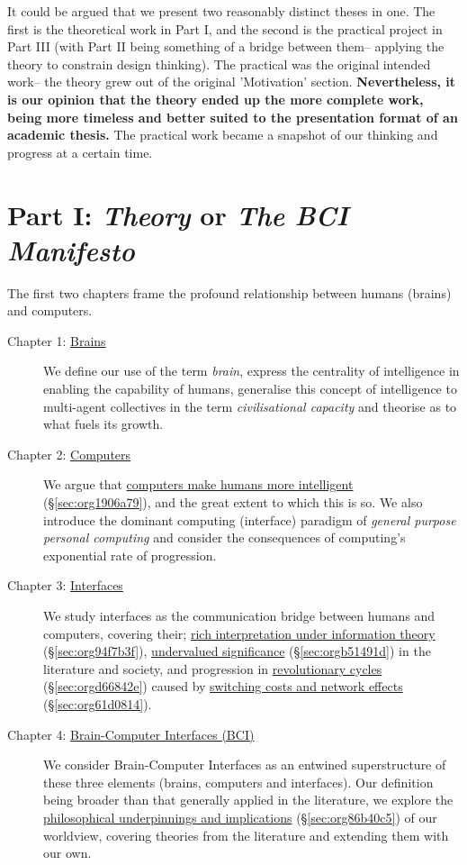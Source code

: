 \documentclass[logo,bsc,singlespacing,parskip]{infthesis}
\begin{document}
It could be argued that we present two reasonably distinct theses in one.
The first is the theoretical work in Part I, and the second is the practical project in Part III (with Part II being something of a bridge between them-- applying the theory to constrain design thinking).
The practical was the original intended work-- the theory grew out of the original 'Motivation' section.
\textbf{Nevertheless, it is our opinion that the theory ended up the more complete work, being more timeless and better suited to the presentation format of an academic thesis.}
The practical work became a snapshot of our thinking and progress at a certain time.
\section*{Part I: \emph{Theory} or \emph{The BCI Manifesto}}
\label{sec:org2b6b7c0}
The first two chapters frame the profound relationship between humans (brains) and computers.

\begin{description}
\item[{Chapter 1: \hyperref[sec:org3af2793]{Brains}}] We define our use of the term \emph{brain}, express the centrality of intelligence in enabling the capability of humans, generalise this concept of intelligence to multi-agent collectives in the term \emph{civilisational capacity} and theorise as to what fuels its growth.

\item[{Chapter 2: \hyperref[sec:org21e9465]{Computers}}] We argue that \hyperref[sec:org1906a79]{computers make humans more intelligent} (\S \ref{sec:org1906a79}), and the great extent to which this is so.
We also introduce the dominant computing (interface) paradigm of \emph{general purpose personal computing} and consider the consequences of computing's exponential rate of progression.

\item[{Chapter 3: \hyperref[sec:org020dbaa]{Interfaces}}] We study interfaces as the communication bridge between humans and computers, covering their;  \hyperref[sec:org94f7b3f]{rich interpretation under information theory} (\S \ref{sec:org94f7b3f}), \hyperref[sec:orgb51491d]{undervalued significance} (\S \ref{sec:orgb51491d}) in the literature and society, and progression in \hyperref[sec:orgd66842e]{revolutionary cycles} (\S \ref{sec:orgd66842e}) caused by \hyperref[sec:org61d0814]{switching costs and network effects} (\S \ref{sec:org61d0814}).

\item[{Chapter 4: \hyperref[sec:org9ee01b8]{Brain-Computer Interfaces (BCI)}}] We consider Brain-Computer Interfaces as an entwined superstructure of these three elements (brains, computers and interfaces). Our definition being broader than that generally applied in the literature, we explore the \hyperref[sec:org86b40c5]{philosophical underpinnings and implications} (\S \ref{sec:org86b40c5}) of our worldview, covering theories from the literature and extending them with our own.
\end{description}
\end{document}
